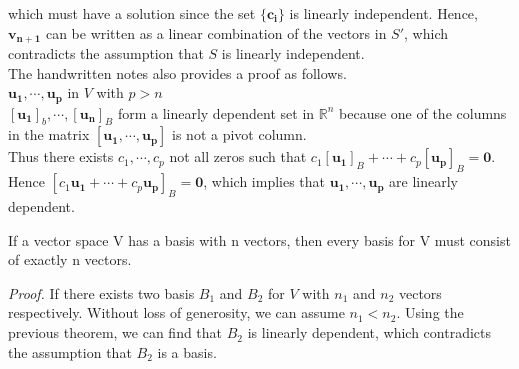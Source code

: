 \documentclass[10pt, a4paper]{article}
\newcommand{\R}{\mathbb{R}}
\newcommand{\vt}[1]{\mathbf{#1}}
\begin{document}
which must have a solution since the set $\{\vt{c_i}\}$ is linearly independent. Hence, $\vt{v_{n+1}}$ can be written as a linear combination of the vectors in $S'$, which contradicts the assumption that $S$ is linearly independent.\\
\indent The handwritten notes also provides a proof as follows. \\
$\vt{u_1}, \cdots, \vt{u_p}$ in $V$ with $p>n$ \\
$[\vt{u_1}]_b, \cdots, [\vt{u_n}]_B$ form a linearly dependent set in $\R^n$ because one of the columns in the matrix $[\vt{u_1}, \cdots, \vt{u_p}]$ is not a pivot column.\\
Thus there exists $c_1, \cdots,c_p$ not all zeros such that $c_1[\vt{u_1}]_B + \cdots + c_p[\vt{u_p}]_B = \vt{0}$.\\
Hence $[c_1\vt{u_1} + \cdots + c_p\vt{u_p}]_B = \vt{0}$, which implies that $\vt{u_1}, \cdots, \vt{u_p}$ are linearly dependent.\\

\begin{proposition}
    If a vector space V has a basis with n vectors, then every basis for V must consist of exactly n vectors.
\end{proposition}
\indent\textit{Proof.} If there exists two basis $B_1$ and $B_2$ for $V$ with $n_1$ and $n_2$ vectors respectively. Without loss of generosity, we can assume $n_1< n_2$. 
Using the previous theorem, we can find that $B_2$ is linearly dependent, which contradicts the assumption that $B_2$ is a basis.\\
\end{document}

